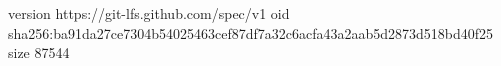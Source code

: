version https://git-lfs.github.com/spec/v1
oid sha256:ba91da27ce7304b54025463cef87df7a32c6acfa43a2aab5d2873d518bd40f25
size 87544
